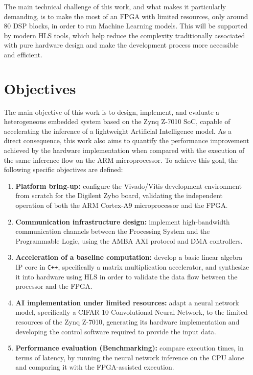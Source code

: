 The main technical challenge of this work, and what makes it particularly demanding,
is to make the most of an \ac{FPGA} with limited resources, only around 80 \ac{DSP} blocks, in
order to run Machine Learning models. This will be supported by modern
\ac{HLS} tools, which help reduce the complexity traditionally associated with
pure hardware design and make the development process more accessible and efficient.

\section*{Objectives}
The main objective of this work is to design, implement, and evaluate a heterogeneous
embedded system based on the Zynq Z-7010 \ac{SoC}, capable of accelerating the inference of a
lightweight Artificial Intelligence model.
As a direct consequence, this work also aims to quantify the performance improvement
achieved by the hardware implementation when compared with the execution of the same
inference flow on the \ac{ARM} microprocessor.
To achieve this goal, the following specific objectives are defined:

\begin{enumerate}
  \item \textbf{Platform bring-up:} configure the Vivado/Vitis development environment
    from scratch for the Digilent Zybo board, validating the independent operation of
    both the \ac{ARM} Cortex-A9 microprocessor and the \ac{FPGA}.
  \item \textbf{Communication infrastructure design:} implement high-bandwidth
    communication channels between the Processing System and the Programmable Logic,
    using the \ac{AMBA} \ac{AXI} protocol and \ac{DMA} controllers.
  \item \textbf{Acceleration of a baseline computation:} develop a basic linear algebra
    \ac{IP} core in \texttt{C++}, specifically a matrix multiplication accelerator, and
    synthesize it
    into hardware using \ac{HLS} in order to validate the data flow between the processor
    and the \ac{FPGA}.
  \item \textbf{\ac{AI} implementation under limited resources:} adapt a neural network model,
    specifically a \ac{CIFAR}-10 Convolutional Neural Network, to the limited resources of
    the Zynq Z-7010, generating its hardware implementation and developing the control
    software required to provide the input data.
  \item \textbf{Performance evaluation (Benchmarking):} compare execution times, in terms
    of latency, by running the neural network inference on the \ac{CPU} alone and comparing
    it with the \ac{FPGA}-assisted execution.
\end{enumerate}

